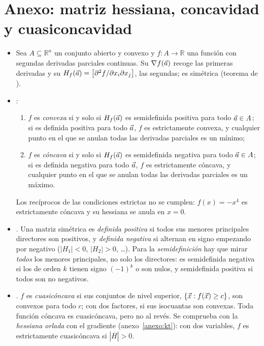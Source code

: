\documentclass[11pt]{article}
\begin{document}
\section{Anexo: matriz hessiana, concavidad y cuasiconcavidad}\label{anexo:hessiana}

\begin{itemize}
\item Sea $A\subseteq\mathbb{R}^n$ un conjunto abierto y convexo y $f:A\to\mathbb{R}$ una función con segundas derivadas parciales continuas. Su  $\nabla f(\vec{a})$ recoge las primeras derivadas y su  $H_f(\vec{a})=\big[\partial^2f/\partial x_i\partial x_j\big]$, las segundas; es simétrica (teorema de ).
\item {}:
  \begin{enumerate}
  \item $f$ es \emph{convexa} si y solo si $H_f(\vec{a})$ es semidefinida positiva para todo $\vec{a}\in A$; si es definida positiva para todo $\vec{a}$, $f$ es estrictamente convexa, y cualquier punto en el que se anulan todas las derivadas parciales es un mínimo;
  \item $f$ es \emph{cóncava} si y solo si $H_f(\vec{a})$ es semidefinida negativa para todo $\vec{a}\in A$; si es definida negativa para todo $\vec{a}$, $f$ es estrictamente cóncava, y cualquier punto en el que se anulan todas las derivadas parciales es un máximo.
  \end{enumerate}
  Los recíprocos de las condiciones estrictas no se cumplen: $f(x)=-x^4$ es estrictamente cóncava y su hessiana se anula en $x=0$.
\item {}. Una matriz simétrica es \emph{definida positiva} si todos sus menores principales directores son positivos, y \emph{definida negativa} si alternan en signo empezando por negativo ($|H_1|<0$, $|H_2|>0$, …). Para la \emph{semidefinición} hay que mirar \emph{todos} los menores principales, no solo los directores: es semidefinida negativa si los de orden $k$ tienen signo $(-1)^k$ o son nulos, y semidefinida positiva si todos son no negativos\nocite{SydsaeterEtAl2008Further}.
\item {}. $f$ es \emph{cuasicóncava} si sus conjuntos de nivel superior, $\{\vec{x}: f(\vec{x})\geq c\}$, son convexos para todo $c$; con dos factores, si sus isocuantas son convexas. Toda función cóncava es cuasicóncava, pero no al revés. Se comprueba con la \emph{hessiana orlada} con el gradiente (anexo~\ref{anexo:kt}): con dos variables, $f$ es estrictamente cuasicóncava si $|\overline{H}|>0$.

\end{itemize}
\end{document}
